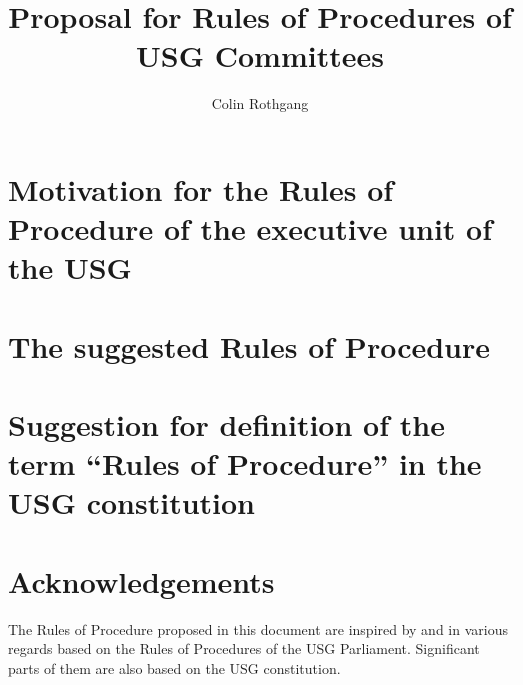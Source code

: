 \documentclass[a4paper,10pt]{article}
\title{Proposal for Rules of Procedures of USG Committees}
\author{Colin Rothgang}
\begin{document}
 \maketitle
 \thispagestyle{empty}
 \tableofcontents
%	 

  \section[Motivation]{Motivation for the Rules of Procedure of the executive unit of the USG}
	 
   \section{The suggested Rules of Procedure}
	 
   \section[Suggested definition of ``Rules of Procedure'']{Suggestion for definition of the term ``Rules of Procedure'' in the USG constitution}
	 
%	 
   \section*{Acknowledgements}
	 The Rules of Procedure proposed in this document are inspired by and in various regards based on the Rules of Procedures of the USG Parliament. Significant parts of them are also based on the USG constitution.
 \label{theEnd}
\end{document}
